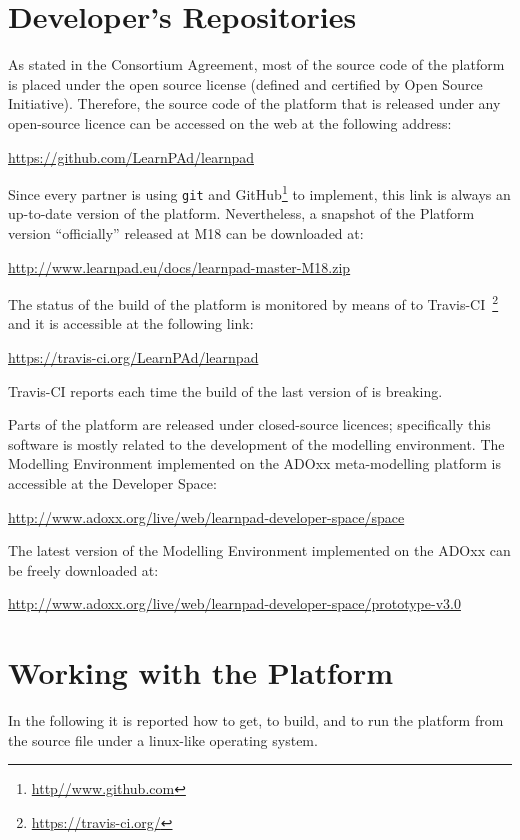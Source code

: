 \documentclass{learnpad}
\begin{document}
\chapter{Developer's Repositories}
\label{ch:sourcecode}

As stated in the Consortium Agreement, most of the source code of the 
platform is placed under the open source license (defined and certified by Open 
Source Initiative). Therefore, the source code of the \learnpad platform that 
is released under any open-source licence can be accessed on the web at the 
following address:

\url{https://github.com/LearnPAd/learnpad}

Since every partner is using \texttt{git} and 
GitHub\footnote{\url{http//www.github.com}} to implement, this link is
always an up-to-date version of the \learnpad platform.
Nevertheless, a snapshot of the \learnpad Platform version ``officially'' released at M18 
can be downloaded at:

\url{http://www.learnpad.eu/docs/learnpad-master-M18.zip}

The status of the build of the platform is monitored by means of to 
Travis-CI~\footnote{\url{https://travis-ci.org/}} and it is accessible at the 
following link:

\url{https://travis-ci.org/LearnPAd/learnpad}

Travis-CI reports each time the build of the last version of \learnpad is
breaking.

Parts of the \learnpad platform are released under closed-source licences; 
specifically this software is mostly related to the development of the modelling 
environment. The \learnpad Modelling Environment implemented on the ADOxx 
meta-modelling platform is accessible at the \learnpad Developer Space:
 
\url{http://www.adoxx.org/live/web/learnpad-developer-space/space}

The latest version of the \learnpad Modelling Environment implemented on the 
ADOxx  can be freely downloaded at:

\url{http://www.adoxx.org/live/web/learnpad-developer-space/prototype-v3.0}

\chapter{Working with the \learnpad Platform}
\label{ch:platform}

In the following it is reported how to get, to build, and to
run the \learnpad platform from the source file under a linux-like
operating system.
\end{document}

